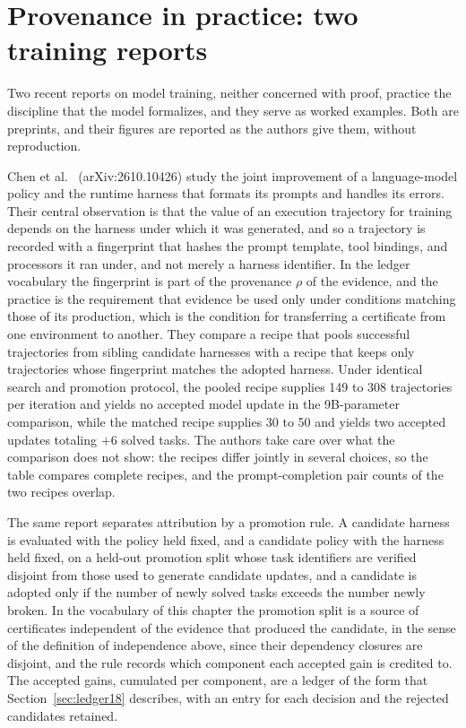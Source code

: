 \section{Provenance in practice: two training reports}

Two recent reports on model training, neither concerned with proof, practice the discipline that the model formalizes, and they serve as worked examples. Both are preprints, and their figures are reported as the authors give them, without reproduction.

Chen et al.\ \cite{Chen26} (arXiv:2610.10426) study the joint improvement of a language-model policy and the runtime harness that formats its prompts and handles its errors. Their central observation is that the value of an execution trajectory for training depends on the harness under which it was generated, and so a trajectory is recorded with a fingerprint that hashes the prompt template, tool bindings, and processors it ran under, and not merely a harness identifier. In the ledger vocabulary the fingerprint is part of the provenance $\rho$ of the evidence, and the practice is the requirement that evidence be used only under conditions matching those of its production, which is the condition for transferring a certificate from one environment to another. They compare a recipe that pools successful trajectories from sibling candidate harnesses with a recipe that keeps only trajectories whose fingerprint matches the adopted harness. Under identical search and promotion protocol, the pooled recipe supplies 149 to 308 trajectories per iteration and yields no accepted model update in the 9B-parameter comparison, while the matched recipe supplies 30 to 50 and yields two accepted updates totaling $+6$ solved tasks. The authors take care over what the comparison does not show: the recipes differ jointly in several choices, so the table compares complete recipes, and the prompt-completion pair counts of the two recipes overlap.

The same report separates attribution by a promotion rule. A candidate harness is evaluated with the policy held fixed, and a candidate policy with the harness held fixed, on a held-out promotion split whose task identifiers are verified disjoint from those used to generate candidate updates, and a candidate is adopted only if the number of newly solved tasks exceeds the number newly broken. In the vocabulary of this chapter the promotion split is a source of certificates independent of the evidence that produced the candidate, in the sense of the definition of independence above, since their dependency closures are disjoint, and the rule records which component each accepted gain is credited to. The accepted gains, cumulated per component, are a ledger of the form that Section~\ref{sec:ledger18} describes, with an entry for each decision and the rejected candidates retained.

